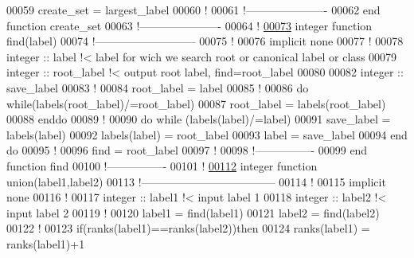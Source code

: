 \begin{DoxyCode}
00059     create\_set = largest\_label
00060     \textcolor{comment}{!}
00061   \textcolor{comment}{!----------------------}
00062 \textcolor{keyword}{  end function create\_set}
00063   \textcolor{comment}{!----------------------}
00064   \textcolor{comment}{!}
\hypertarget{module__disjoint__set_8f90_source_l00073}{}\hyperlink{classmodule__disjoint__set_aab6780106768f39173390102bb951275}{00073}   \textcolor{keyword}{integer }\textcolor{keyword}{function }find(label)
00074   \textcolor{comment}{!---------------------------}
00075     \textcolor{comment}{!}
00076     \textcolor{keyword}{implicit none}
00077     \textcolor{comment}{!}
00078     \textcolor{keywordtype}{integer} :: label \textcolor{comment}{!< label for wich we search root or canonical label or
       class}
00079     \textcolor{keywordtype}{integer} :: root\_label \textcolor{comment}{!< output root label, find=root\_label}
00080 
00082     \textcolor{keywordtype}{integer} :: save\_label 
00083     \textcolor{comment}{!}
00084     root\_label = label
00085     \textcolor{comment}{!}
00086     \textcolor{keyword}{do} \textcolor{keyword}{while}(labels(root\_label)/=root\_label)
00087        root\_label = labels(root\_label)
00088     \textcolor{keyword}{enddo}
00089     \textcolor{comment}{!}
00090     \textcolor{keyword}{do} \textcolor{keyword}{while} (labels(label)/=label)
00091        save\_label = labels(label)
00092        labels(label) = root\_label
00093        label = save\_label
00094     \textcolor{keyword}{end do}
00095     \textcolor{comment}{!}
00096     find = root\_label
00097     \textcolor{comment}{!}
00098   \textcolor{comment}{!----------------}
00099 \textcolor{keyword}{  end function find}
00100   \textcolor{comment}{!----------------}
00101   \textcolor{comment}{!}
\hypertarget{module__disjoint__set_8f90_source_l00112}{}\hyperlink{classmodule__disjoint__set_a0ce8857aac3e2281a0010c81f02d00f1}{00112}   \textcolor{keyword}{integer }\textcolor{keyword}{function }union(label1,label2)
00113   \textcolor{comment}{!------------------------------------ }
00114     \textcolor{comment}{!}
00115     \textcolor{keyword}{implicit none}
00116     \textcolor{comment}{!}
00117     \textcolor{keywordtype}{integer} :: label1 \textcolor{comment}{!< input label 1}
00118     \textcolor{keywordtype}{integer} :: label2 \textcolor{comment}{!< input label 2}
00119     \textcolor{comment}{!}
00120     label1 = find(label1)
00121     label2 = find(label2)
00122     \textcolor{comment}{!}
00123     \textcolor{keyword}{if}(ranks(label1)==ranks(label2))\textcolor{keyword}{then}
00124        ranks(label1) = ranks(label1)+1

\end{DoxyCode}
